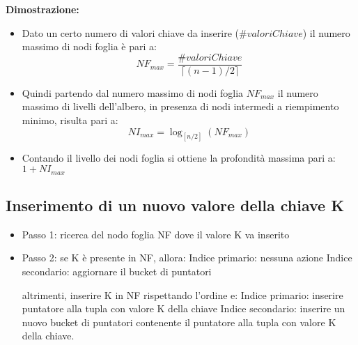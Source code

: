 \documentclass[a4paper, 10pt]{article}
\theoremstyle{definition}
\begin{document}
	\textbf{Dimostrazione: }
	
	\begin{itemize}
		\item Dato un certo numero di valori chiave da inserire ($ \# valoriChiave $) il
		numero massimo di nodi foglia è pari a:
		\[
			NF_{max} = \frac{\# valoriChiave}{\lceil (n -1) / 2 \rceil}
		\]
		\item Quindi partendo dal numero massimo di nodi foglia $ NF_{max} $ il numero
		massimo di livelli dell'albero, in presenza di nodi intermedi a
		riempimento minimo, risulta pari a:
		\[
			NI_{max} = \log_{[n/2]} (NF_{max} )
		\]
		\item Contando il livello dei nodi foglia si ottiene la profondità massima pari
		a: $ 1 + NI_{max} $
	\end{itemize}
	
	\subsection*{Inserimento di un nuovo valore della chiave K}
	\begin{itemize}
		\item Passo 1: ricerca del nodo foglia NF dove il valore K va inserito
		\item Passo 2: se K è presente in NF, allora:
			\subitem{-} Indice primario: nessuna azione
			\subitem{-} Indice secondario: aggiornare il bucket di puntatori
		
		altrimenti, inserire K in NF rispettando l'ordine e:
			\subitem{-} Indice primario: inserire puntatore alla tupla con valore K della chiave
			\subitem{-} Indice secondario: inserire un nuovo bucket di puntatori contenente il puntatore alla tupla
			con valore K della chiave.
	\end{itemize}
	
\end{document}

